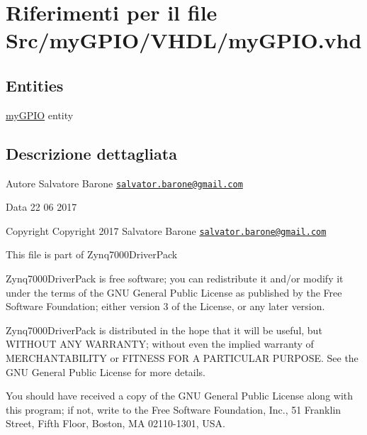 \hypertarget{my_g_p_i_o_8vhd}{\section{Riferimenti per il file Src/my\+G\+P\+I\+O/\+V\+H\+D\+L/my\+G\+P\+I\+O.vhd}
\label{my_g_p_i_o_8vhd}
}
\subsection*{Entities}
\begin{DoxyCompactItemize}
\item 
\hyperlink{classmy_g_p_i_o}{my\+G\+P\+I\+O} entity
\end{DoxyCompactItemize}


\subsection{Descrizione dettagliata}
\begin{DoxyAuthor}{Autore}
Salvatore Barone \href{mailto:salvator.barone@gmail.com}{\tt salvator.\+barone@gmail.\+com} 
\end{DoxyAuthor}
\begin{DoxyDate}{Data}
22 06 2017
\end{DoxyDate}
\begin{DoxyCopyright}{Copyright}
Copyright 2017 Salvatore Barone \href{mailto:salvator.barone@gmail.com}{\tt salvator.\+barone@gmail.\+com}
\end{DoxyCopyright}
This file is part of Zynq7000\+Driver\+Pack

Zynq7000\+Driver\+Pack is free software; you can redistribute it and/or modify it under the terms of the G\+N\+U General Public License as published by the Free Software Foundation; either version 3 of the License, or any later version.

Zynq7000\+Driver\+Pack is distributed in the hope that it will be useful, but W\+I\+T\+H\+O\+U\+T A\+N\+Y W\+A\+R\+R\+A\+N\+T\+Y; without even the implied warranty of M\+E\+R\+C\+H\+A\+N\+T\+A\+B\+I\+L\+I\+T\+Y or F\+I\+T\+N\+E\+S\+S F\+O\+R A P\+A\+R\+T\+I\+C\+U\+L\+A\+R P\+U\+R\+P\+O\+S\+E. See the G\+N\+U General Public License for more details.

You should have received a copy of the G\+N\+U General Public License along with this program; if not, write to the Free Software Foundation, Inc., 51 Franklin Street, Fifth Floor, Boston, M\+A 02110-\/1301, U\+S\+A. 